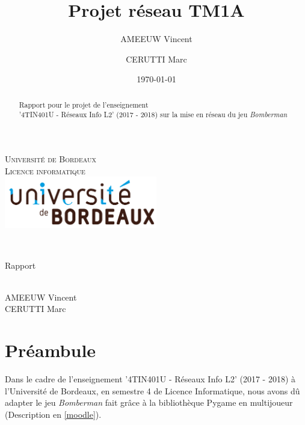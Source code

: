\documentclass[a4paper]{article}
\title{Projet réseau  TM1A}
\author{AMEEUW Vincent\and CERUTTI Marc}
\date{\today}
\begin{document}
\makeatletter
  \begin{titlepage}
  \centering
      {\large \textsc{Université de Bordeaux}}\\
      \textsc{Licence informatique}\\
    \vspace{1cm}
      \includegraphics[width=0.5\textwidth]{IMG_Latex/ubx-logo.png}\\
	\vspace{2cm}

\begin{center}
	{\large\textbf{	\@date}}\\
	\vspace{15mm}

    {\Huge   Rapport\\
    \vspace{5mm}
    \textbf{\@title}\\}

    \vspace{15mm}
    {\large AMEEUW Vincent \\ CERUTTI Marc} \\

    \vspace{15mm}
	\begin{abstract}
	\center
	Rapport pour le projet de l'enseignement \\'4TIN401U - Réseaux Info L2' (2017 - 2018) sur la mise en réseau du jeu \textit{Bomberman}\\
	\end{abstract}
\end{center}


  \end{titlepage}
\makeatother


\cleardoublepage
\tableofcontents

\newpage

\part{Préambule}

Dans le cadre de l'enseignement '4TIN401U - Réseaux Info L2' (2017 - 2018) à l'Université de Bordeaux, en semestre 4 de Licence Informatique, nous avons dû adapter le jeu \textit{Bomberman} fait grâce à la bibliothèque Pygame en multijoueur (Description en \ref{moodle}).
\\
\end{document}
